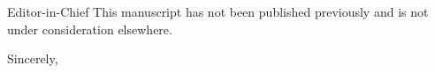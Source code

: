 \documentclass[11pt]{letter}
\begin{document}
\begin{letter}{Editor-in-Chief}
This manuscript has not been published previously and is not under consideration elsewhere.

\closing{Sincerely,}

\end{letter}
\end{document}
